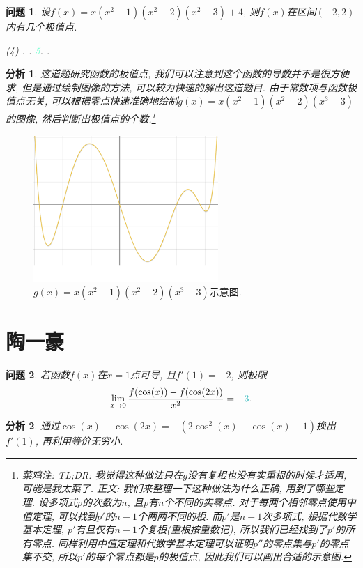 \documentclass[a4paper, 12pt]{ctexart}
\theoremstyle{plain}
\newtheorem{problem}{问题}
\theoremstyle{nonumberplain}
\newtheorem{analysis}{分析}
\newcommand{\ans}[1]{\textcolor{Aquamarine}{#1}}
\newcommand{\efootnote}[1]{\footnote{菜鸡注: #1}}
\begin{document}
\begin{problem}
    设$f(x) = x(x^2-1)(x^2-2)(x^2-3)+4$, 则$f(x)$在区间$(-2, 2)$内有几个极值点.
    \begin{tasks}(4)
        .
        .
        \task[\ans{(C)}] \ans{5}.
        .
    \end{tasks}
\end{problem}
\begin{analysis}
    这道题研究函数的极值点, 我们可以注意到这个函数的导数并不是很方便求, 但是通过绘制图像的方法, 可以较为快速的解出这道题目. 由于常数项与函数极值点无关, 可以根据零点快速准确地绘制$g(x)=x(x^2-1)(x^2-2)(x^3-3)$的图像, 然后判断出极值点的个数.\efootnote{TL;DR: 我觉得这种做法只在$g$没有复根也没有实重根的时候才适用, 可能是我太菜了. 正文: 我们来整理一下这种做法为什么正确, 用到了哪些定理. 设多项式$p$的次数为$n$, 且$p$有$n$个不同的实零点. 对于每两个相邻零点使用中值定理, 可以找到$p'$的$n-1$个两两不同的根. 而$p'$是$n-1$次多项式, 根据代数学基本定理, $p'$有且仅有$n-1$个复根(重根按重数记), 所以我们已经找到了$p'$的所有零点. 同样利用中值定理和代数学基本定理可以证明$p''$的零点集与$p'$的零点集不交, 所以$p'$的每个零点都是$p$的极值点, 因此我们可以画出合适的示意图.}
\end{analysis}
\begin{figure}[htb]
    \centering
    \includegraphics[width=7cm]{wsm.png}
    \caption{$g(x)=x(x^2-1)(x^2-2)(x^3-3)$示意图.}
\end{figure}

\section{陶一豪}

\begin{problem}
    若函数$f(x)$在$x=1$点可导, 且$f'(1)=-2$, 则极限
    \begin{equation}
        \lim_{x\to 0}\frac{f(\cos(x))-f(\cos(2x))}{x^2}=\ans{-3}.
    \end{equation}
\end{problem}
\begin{analysis}
    通过$\cos(x)-\cos(2x)=-(2\cos^2(x)-\cos(x)-1)$换出$f'(1)$, 再利用等价无穷小.
\end{analysis}
\end{document}
